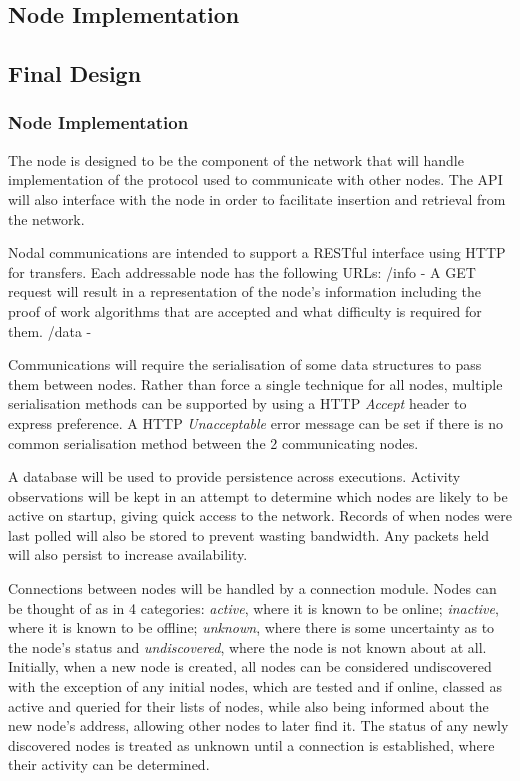 	\subsection{Node Implementation}
	
	\subsection{Final Design}
		\subsubsection{Node Implementation}
		
		
			The node is designed to be the component of the network that will handle implementation of the protocol used to communicate with other nodes. The API will also interface with the node in order to facilitate insertion and retrieval from the network.
			
			Nodal communications are intended to support a RESTful interface using HTTP for transfers. Each addressable node has the following URLs:
				/info - A GET request will result in a representation of the node's information including the proof of work algorithms that are accepted and what difficulty is required for them.
				/data - 
				
			Communications will require the serialisation of some data structures to pass them between nodes. Rather than force a single technique for all nodes, multiple serialisation methods can be supported by using a HTTP \textit{Accept} header to express preference. A HTTP \textit{Unacceptable} error message can be set if there is no common serialisation method between the 2 communicating nodes.
			
			A database will be used to provide persistence across executions. Activity observations will be kept in an attempt to determine which nodes are likely to be active on startup, giving quick access to the network. Records of when nodes were last polled will also be stored to prevent wasting bandwidth. Any packets held will also persist to increase availability.
			
			Connections between nodes will be handled by a connection module. Nodes can be thought of as in 4 categories: \emph{active}, where it is known to be online; \emph{inactive}, where it is known to be offline; \emph{unknown}, where there is some uncertainty as to the node's status and \emph{undiscovered}, where the node is not known about at all. Initially, when a new node is created, all nodes can be considered undiscovered with the exception of any initial nodes, which are tested and if online, classed as active and queried for their lists of nodes, while also being informed about the new node's address, allowing other nodes to later find it. The status of any newly discovered nodes is treated as unknown until a connection is established, where their activity can be determined. 
			

